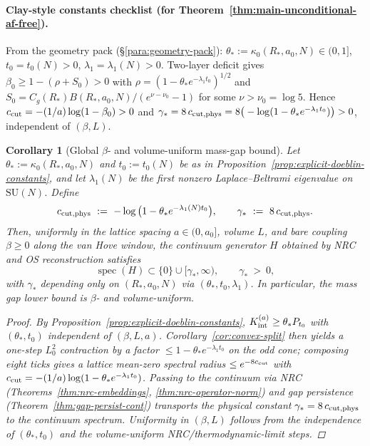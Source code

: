 \documentclass[11pt]{amsart}
\theoremstyle{plain}
\newtheorem{corollary}[theorem]{Corollary}
\theoremstyle{definition}
\theoremstyle{remark}
\begin{document}
\paragraph{Clay-style constants checklist (for Theorem~\ref{thm:main-unconditional-af-free}).}
From the geometry pack (\S\ref{para:geometry-pack}): $\theta_*:=\kappa_0(R_*,a_0,N)\in(0,1]$, $t_0=t_0(N)>0$, $\lambda_1=\lambda_1(N)>0$. Two-layer deficit gives $\beta_0\ge 1-(\rho+S_0)>0$ with $\rho=(1-\theta_* e^{-\lambda_1 t_0})^{1/2}$ and $S_0= C_g(R_*) B(R_*,a_0,N)/(e^{\nu-\nu_0}-1)$ for some $\nu>\nu_0=\log 5$. Hence $c_{\rm cut}=-(1/a)\log(1-\beta_0)>0$ and $\gamma_*=8\,c_{\rm cut,phys}=8\big(-\log(1-\theta_* e^{-\lambda_1 t_0})\big)>0$, independent of $(\beta,L)$.

\medskip

\begin{corollary}[Global $\beta$- and volume-uniform mass-gap bound]\label{cor:global-uniform-gap}
Let $\theta_*:=\kappa_0(R_*,a_0,N)$ and $t_0:=t_0(N)$ be as in Proposition~\ref{prop:explicit-doeblin-constants}, and let $\lambda_1(N)$ be the first nonzero Laplace--Beltrami eigenvalue on $\mathrm{SU}(N)$. Define
\[
  c_{\rm cut,phys}\ :=\ -\log\big(1-\theta_* e^{-\lambda_1(N) t_0}\big),\qquad \gamma_*\ :=\ 8\,c_{\rm cut,phys}.
\]
Then, uniformly in the lattice spacing $a\in(0,a_0]$, volume $L$, and bare coupling $\beta\ge 0$ along the van Hove window, the continuum generator $H$ obtained by NRC and OS reconstruction satisfies
\[
  \operatorname{spec}(H)\subset\{0\}\cup[\gamma_*,\infty),\qquad \gamma_*\ >\ 0,
\]
with $\gamma_*$ depending only on $(R_*,a_0,N)$ via $(\theta_*,t_0,\lambda_1)$. In particular, the mass gap lower bound is $\beta$- and volume-uniform.
\begin{proof}
By Proposition~\ref{prop:explicit-doeblin-constants}, $K_{\rm int}^{(a)}\ge \theta_* P_{t_0}$ with $(\theta_*,t_0)$ independent of $(\beta,L,a)$. Corollary~\ref{cor:convex-split} then yields a one-step $L^2_0$ contraction by a factor $\le 1-\theta_* e^{-\lambda_1 t_0}$ on the odd cone; composing eight ticks gives a lattice mean-zero spectral radius $\le e^{-8 c_{\rm cut}}$ with $c_{\rm cut} = -(1/a)\log(1-\theta_* e^{-\lambda_1 t_0})$. Passing to the continuum via NRC (Theorems~\ref{thm:nrc-embeddings}, \ref{thm:nrc-operator-norm}) and gap persistence (Theorem~\ref{thm:gap-persist-cont}) transports the physical constant $\gamma_* = 8\,c_{\rm cut,phys}$ to the continuum spectrum. Uniformity in $(\beta,L)$ follows from the independence of $(\theta_*,t_0)$ and the volume-uniform NRC/thermodynamic-limit steps.
\end{proof}
\end{corollary}
\end{document}
